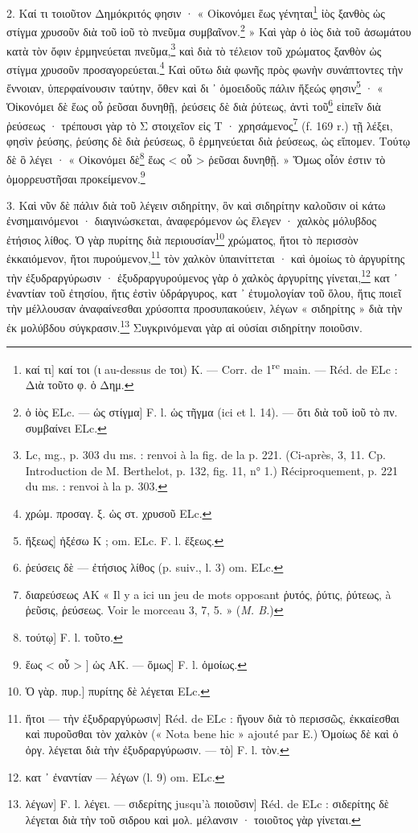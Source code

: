 \documentclass[a4paper, 11pt, oneside, polutonikogreek, french]{article}
\begin{document}
2. Καί τι τοιοῦτον Δημόκριτός φησιν · « Οἰκονόμει ἕως γένηται\footnote{καί τι] καί τοι (ι au-dessus de τοι) K. --- Corr. de 1\textsuperscript{re} main. --- Réd. de ELc : Διὰ τοῦτο φ. ὁ Δημ.} ἰὸς ξανθὸς ὡς στίγμα χρυσοῦν διὰ τοῦ ἰοῦ τὸ πνεῦμα συμβαῖνον.\footnote{ὁ ἰὸς ELc. --- ὡς στίγμα] F. l. ὡς τῆγμα (ici et l. 14). --- ὅτι διὰ τοῦ ἰοῦ τὸ πν. συμβαίνει ELc.} » Καὶ γὰρ ὁ ἰὸς διὰ τοῦ ἀσωμάτου κατὰ τὸν ὄφιν ἑρμηνεύεται πνεῦμα,\footnote{Lc, mg., p. 303 du ms. : renvoi à la fig. de la p. 221. (Ci-après, 3, 11. Cp. Introduction de M. Berthelot, p. 132, fig. 11, n° 1.) Réciproquement, p. 221 du ms. : renvoi à la p. 303.} καὶ διὰ τὸ τέλειον τοῦ χρώματος ξανθὸν ὠς στίγμα χρυσοῦν προσαγορεύεται.\footnote{χρώμ. προσαγ. ξ. ὡς στ. χρυσοῦ ELc.} Καὶ οὕτω διὰ φωνῆς πρὸς φωνὴν συνάπτοντες τὴν ἔννοιαν, ὑπερφαίνουσιν ταύτην, ὅθεν καὶ δι ᾽ ὁμοειδοῦς πάλιν ἥξεώς φησιν\footnote{ἥξεως] ἡξέσω K ; om. ELc. F. l. ἕξεως.} · « Ὁἰκονόμει δὲ ἕως οὗ ῥεῦσαι δυνηθῇ, ῥεύσεις δὲ διὰ ῥύτεως, ἀντὶ τοῦ\footnote{ῥεύσεις δὲ --- ἐτήσιος λίθος (p. suiv., l. 3) om. ELc.} εἰπεῖν διὰ ῥεύσεως · τρέπουσι γὰρ τὸ Σ στοιχεῖον εἰς Τ · χρησάμενος\footnote{διαρεύσεως AK « Il y a ici un jeu de mots opposant ῥυτός, ῥύτις, ῥύτεως, à ῥεῦσις, ῥεύσεως. Voir le morceau 3, 7, 5. » (\emph{M. B.})} (f. 169 r.) τῇ λέξει, φησὶν ῥεύσης, ῥεύσης δὲ διὰ ῥεύσεως, ὃ ἑρμηνεύεται διὰ ῥεύσεως, ὡς εἴπομεν. Τούτῳ δὲ ὃ λέγει · « Οἰκονόμει δὲ\footnote{τούτῳ] F. l. τοῦτο.} ἕως < οὗ > ῥεῦσαι δυνηθῇ. » Ὅμως οἷόν ἐστιν τὸ ὁμορρευστῆσαι προκείμενον.\footnote{ἕως < οὗ > ] ὡς AK. --- ὅμως] F. l. ὁμοίως.}

3. Καὶ νῦν δὲ πάλιν διὰ τοῦ λέγειν σιδηρίτην, ὃν καὶ σιδηρίτην καλοῦσιν οἱ κάτω ἐνσημαινόμενοι · διαγινώσκεται, ἀναφερόμενον ὡς ἔλεγεν · χαλκὸς μόλυβδος ἐτήσιος λίθος. Ὁ γὰρ πυρίτης διὰ περιουσίαν\footnote{Ὁ γὰρ. πυρ.] πυρίτης δὲ λέγεται ELc.} χρώματος, ἤτοι τὸ περισσὸν ἐκκαιόμενον, ἤτοι πυρούμενον,\footnote{ἤτοι --- τὴν ἐξυδραργύρωσιν] Réd. de ELc : ἤγουν διὰ τὸ περισσῶς, ἐκκαίεσθαι καὶ πυροῦσθαι τὸν χαλκὸν (« Nota bene hic » ajouté par E.) Ὁμοίως δὲ καὶ ὁ ὀργ. λέγεται διὰ τὴν ἐξυδραργύρωσιν. --- τὸ] F. l. τὸν.} τὸν χαλκὸν ὑπαινίττεται · καὶ ὁμοίως τὸ ἀργυρίτης τὴν ἐξυδραργύρωσιν · ἐξυδραργυρούμενος γὰρ ὁ χαλκὸς ἀργυρίτης γίνεται,\footnote{κατ ᾽ ἐναντίαν --- λέγων (l. 9) om. ELc.} κατ ᾽ ἐναντίαν τοῦ ἐτησίου, ἥτις ἐστὶν ὑδράργυρος, κατ ᾽ ἐτυμολογίαν τοῦ ὅλου, ἥτις ποιεῖ τὴν μέλλουσαν ἀναφαίνεσθαι χρύσοπτα προσυπακούειν, λέγων « σιδηρίτης » διὰ τὴν ἐκ μολύβδου σύγκρασιν.\footnote{λέγων] F. l. λέγει. --- σιδερίτης jusqu'à ποιοῦσιν] Réd. de ELc : σιδερίτης δὲ λέγεται διὰ τὴν τοῦ σιδρου καὶ μολ. μέλανσιν · τοιοῦτος γὰρ γίνεται.} Συγκρινόμεναι γὰρ αἱ οὐσίαι σιδηρίτην ποιοῦσιν.
\end{document}
